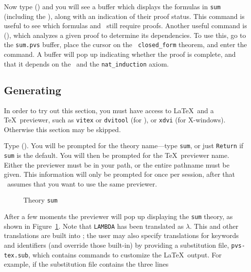 Now type  () and you will see a
buffer which displays the formulas in {\tt sum} (including the \tccs),
along with an indication of their proof status.  This command is
useful to see which formulas and \tccs\ still require proofs.  Another
useful command is  (), which
analyzes a given proof to determine its dependencies.  To use this,
go to the {\tt sum.pvs} buffer, place the cursor on the {\tt
closed\_form} theorem, and enter the command.  A buffer will pop up
indicating whether the proof is complete, and that it depends on the
\tccs\ and the {\tt nat\_induction} axiom.

\subsection[Generating \LaTeX]{Generating \BoldLaTeX}

In order to try out this section, you must have access to \LaTeX\ and a
\TeX\ previewer, such as {\tt vitex} or {\tt dvitool} (for \sunview), or
{\tt xdvi} (for X-windows).  Otherwise this section may be skipped.

Type  ().  You will be prompted for
the theory name---type {\tt sum}, or just {\tt Return} if {\tt sum} is
the default.  You will then be prompted for the \TeX\ previewer name.
Either the previewer must be in your path, or the entire pathname must
be given.  This information will only be prompted for once per session,
after that \pvs\ assumes that you want to use the same previewer.

\begin{figure}[ht]
\begin{center}
\begin{boxedminipage}{\textwidth}
{\smaller\smaller}
\end{boxedminipage}
\end{center}
\caption{Theory {\tt sum}}\label{sum-plain}
\end{figure}

After a few moments the previewer will pop up displaying the {\tt sum}
theory, as shown in Figure~\ref{sum-plain}.  Note that {\tt LAMBDA}
has been translated as $\lambda$.  This and other translations are
built into \pvs; the user may also specify translations for keywords
and identifiers (and override those built-in) by providing a
substitution file, {\tt pvs-tex.sub}, which contains commands to
customize the \LaTeX\ output.  For example, if the substitution file
contains the three lines

